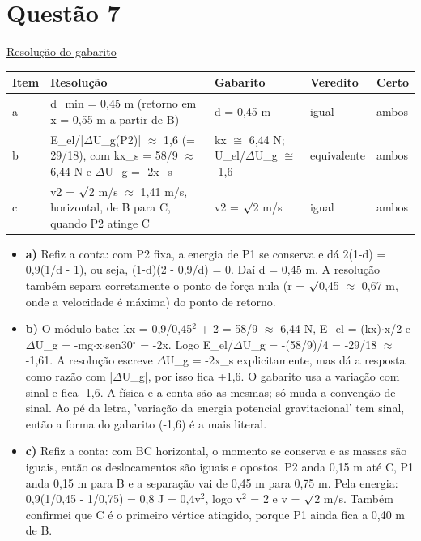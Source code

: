 \documentclass{article}%
\begin{document}
\section*{Questão 7}%
\href{https://poliedroresolve.sistemapoliedro.com.br/vestibulares/ime/2027/ime-2-fase-dia-2-27-10-2026-2-fase-dia-2/dissertativa-7-fisica-2-fase-dia-2-ime-2027}{Resolução do gabarito}\par\smallskip%
\begin{longtable}{@{}p{} p{} p{} p{} p{}@{}}\toprule Item & Resolução & Gabarito & Veredito & Certo \\ \midrule
a & d\_min = 0,45 m (retorno em x = 0,55 m a partir de B) & d = 0,45 m & igual & ambos \\
b & E\_el/|$\Delta$U\_g(P2)| $\approx$ 1,6 (= 29/18), com kx\_s = 58/9 $\approx$ 6,44 N e $\Delta$U\_g = -2x\_s & kx $\cong$ 6,44 N; U\_el/$\Delta$U\_g $\cong$ -1,6 & equivalente & ambos \\
c & v2 = $\surd$2 m/s $\approx$ 1,41 m/s, horizontal, de B para C, quando P2 atinge C & v2 = $\surd$2 m/s & igual & ambos \\
\bottomrule\end{longtable}%
\begin{itemize}%
\item%
\textbf{a)} Refiz a conta: com P2 fixa, a energia de P1 se conserva e dá 2(1-d) = 0,9(1/d - 1), ou seja, (1-d)(2 - 0,9/d) = 0. Daí d = 0,45 m. A resolução também separa corretamente o ponto de força nula (r = $\surd$0,45 $\approx$ 0,67 m, onde a velocidade é máxima) do ponto de retorno.%
\item%
\textbf{b)} O módulo bate: kx = 0,9/0,45$^2$ + 2 = 58/9 $\approx$ 6,44 N, E\_el = (kx)$\cdot$x/2 e $\Delta$U\_g = -mg$\cdot$x$\cdot$sen30$^\circ$ = -2x. Logo E\_el/$\Delta$U\_g = -(58/9)/4 = -29/18 $\approx$ -1,61. A resolução escreve $\Delta$U\_g = -2x\_s explicitamente, mas dá a resposta como razão com |$\Delta$U\_g|, por isso fica +1,6. O gabarito usa a variação com sinal e fica -1,6. A física e a conta são as mesmas; só muda a convenção de sinal. Ao pé da letra, 'variação da energia potencial gravitacional' tem sinal, então a forma do gabarito (-1,6) é a mais literal.%
\item%
\textbf{c)} Refiz a conta: com BC horizontal, o momento se conserva e as massas são iguais, então os deslocamentos são iguais e opostos. P2 anda 0,15 m até C, P1 anda 0,15 m para B e a separação vai de 0,45 m para 0,75 m. Pela energia: 0,9(1/0,45 - 1/0,75) = 0,8 J = 0,4v$^2$, logo v$^2$ = 2 e v = $\surd$2 m/s. Também confirmei que C é o primeiro vértice atingido, porque P1 ainda fica a 0,40 m de B.%
\end{itemize}%
\end{document}
